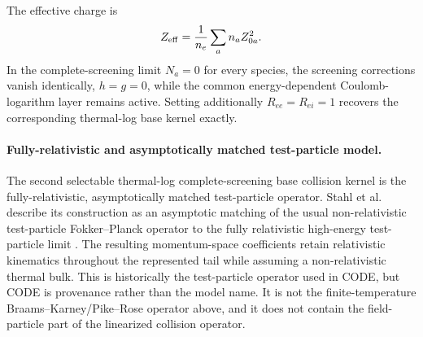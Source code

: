 \documentclass[11pt]{article}
\begin{document}
The effective charge is
\begin{equation}
 Z_{\rm eff}=\frac{1}{n_e}\sum_a n_a Z_{0a}^2.
\end{equation}
In the complete-screening limit $N_a=0$ for every species, the screening corrections
vanish identically, $h=g=0$, while the common energy-dependent Coulomb-logarithm layer
remains active.  Setting additionally $R_{ee}=R_{ei}=1$ recovers the corresponding
thermal-log base kernel exactly.


\paragraph{Fully-relativistic and asymptotically matched test-particle model.}
The second selectable thermal-log complete-screening base collision kernel is the fully-relativistic,
asymptotically matched test-particle operator.  Stahl et al. describe its construction as
an asymptotic matching of the usual non-relativistic test-particle Fokker--Planck
operator to the fully relativistic high-energy test-particle limit
\cite{Stahl2016}.  The resulting momentum-space coefficients retain relativistic
kinematics throughout the represented tail while assuming a non-relativistic thermal
bulk.  This is historically the test-particle operator used in CODE, but CODE is
provenance rather than the model name.  It is not the finite-temperature
Braams--Karney/Pike--Rose operator above, and it does not contain the field-particle part
of the linearized collision operator.
\end{document}
